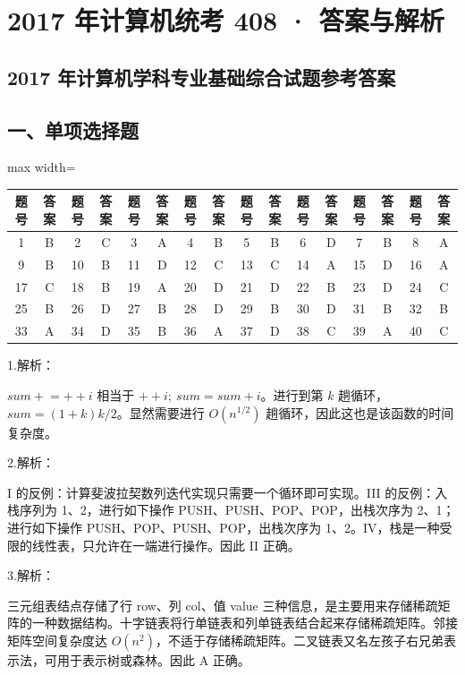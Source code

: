 \documentclass[UTF8,11pt]{ctexart}
\begin{document}
\section*{2017 年计算机统考 408 · 答案与解析}
\subsection*{2017 年计算机学科专业基础综合试题参考答案}

\subsection*{一、单项选择题}

\begin{center}\begin{adjustbox}{max width=\linewidth}\begin{tabular}{|c|c|c|c|c|c|c|c|c|c|c|c|c|c|c|c|}\hline
题号 & 答案 & 题号 & 答案 & 题号 & 答案 & 题号 & 答案 & 题号 & 答案 & 题号 & 答案 & 题号 & 答案 & 题号 & 答案\\\hline
1 & B & 2 & C & 3 & A & 4 & B & 5 & B & 6 & D & 7 & B & 8 & A\\\hline
9 & B & 10 & B & 11 & D & 12 & C & 13 & C & 14 & A & 15 & D & 16 & A\\\hline
17 & C & 18 & B & 19 & A & 20 & D & 21 & D & 22 & B & 23 & D & 24 & C\\\hline
25 & B & 26 & D & 27 & B & 28 & D & 29 & B & 30 & D & 31 & B & 32 & B\\\hline
33 & A & 34 & D & 35 & B & 36 & A & 37 & D & 38 & C & 39 & A & 40 & C\\\hline\end{tabular}\end{adjustbox}\end{center}

1.解析：


\(\displaystyle sum\mathrel{+}=++i\) 相当于 \(\displaystyle ++i;\ sum=sum+i\)。进行到第 \(\displaystyle k\) 趟循环，\(\displaystyle sum=(1+k)k/2\)。显然需要进行 \(\displaystyle O(n^{1/2})\) 趟循环，因此这也是该函数的时间复杂度。


2.解析：


I 的反例：计算斐波拉契数列迭代实现只需要一个循环即可实现。III 的反例：入栈序列为 1、2，进行如下操作 PUSH、PUSH、POP、POP，出栈次序为 2、1；进行如下操作 PUSH、POP、PUSH、POP，出栈次序为 1、2。IV，栈是一种受限的线性表，只允许在一端进行操作。因此 II 正确。


3.解析：


三元组表结点存储了行 row、列 col、值 value 三种信息，是主要用来存储稀疏矩阵的一种数据结构。十字链表将行单链表和列单链表结合起来存储稀疏矩阵。邻接矩阵空间复杂度达 \(\displaystyle O(n^2)\)，不适于存储稀疏矩阵。二叉链表又名左孩子右兄弟表示法，可用于表示树或森林。因此 A 正确。
\end{document}
